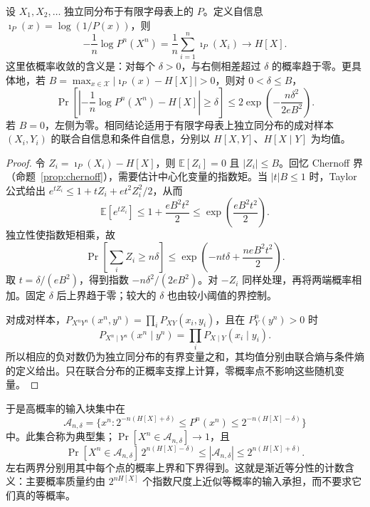\documentclass[lang=cn,a4paper,fontset=none,zihao=false,10pt,openany,twoside]{beautybook}
\numberwithin{algorithm}{chapter}
\begin{document}
\begin{proposition}[自信息的集中与渐近等分性]\label{prop:aep}
设 $X_1,X_2,\ldots$ 独立同分布于有限字母表上的 $P$。定义自信息 $\imath_P(x)=\log(1/P(x))$，则
\[
 -\frac1n\log P^n(X^n)=\frac1n\sum_{i=1}^n\imath_P(X_i)
 \to H[X].
\]
这里依概率收敛的含义是：对每个 $\delta>0$，与右侧相差超过 $\delta$ 的概率趋于零。更具体地，若 $B=\max_{x\in\mathcal X}|\imath_P(x)-H[X]|>0$，则对 $0<\delta\le B$，
\[
 \Pr\left[\left|-\frac1n\log P^n(X^n)-H[X]\right|\ge\delta\right]
 \le2\exp\left(-\frac{n\delta^2}{2eB^2}\right).
\]
若 $B=0$，左侧为零。相同结论适用于有限字母表上独立同分布的成对样本 $(X_i,Y_i)$ 的联合自信息和条件自信息，分别以 $H[X,Y]$、$H[X\mid Y]$ 为均值。
\end{proposition}
\begin{proof}
令 $Z_i=\imath_P(X_i)-H[X]$，则 $\mathbb E[Z_i]=0$ 且 $|Z_i|\le B$。回忆 Chernoff 界（命题~\ref{prop:chernoff}），需要估计中心化变量的指数矩。当 $|t|B\le1$ 时，Taylor 公式给出 $e^{tZ_i}\le1+tZ_i+e t^2Z_i^2/2$，从而
\[
 \mathbb E[e^{tZ_i}]\le1+\frac{eB^2t^2}{2}
 \le\exp\left(\frac{eB^2t^2}{2}\right).
\]
独立性使指数矩相乘，故
\[
 \Pr\left[\sum_iZ_i\ge n\delta\right]
 \le\exp\left(-nt\delta+\frac{neB^2t^2}{2}\right).
\]
取 $t=\delta/(eB^2)$，得到指数 $-n\delta^2/(2eB^2)$。对 $-Z_i$ 同样处理，再将两端概率相加。固定 $\delta$ 后上界趋于零；较大的 $\delta$ 也由较小阈值的界控制。

对成对样本，$P_{X^nY^n}(x^n,y^n)=\prod_iP_{XY}(x_i,y_i)$，且在 $P_Y^n(y^n)>0$ 时
\[
 P_{X^n\mid Y^n}(x^n\mid y^n)=\prod_iP_{X\mid Y}(x_i\mid y_i).
\]
所以相应的负对数仍为独立同分布的有界变量之和，其均值分别由联合熵与条件熵的定义给出。只在联合分布的正概率支撑上计算，零概率点不影响这些随机变量。
\end{proof}
于是高概率的输入块集中在
\[
 \mathcal A_{n,\delta}
 =\{x^n:2^{-n(H[X]+\delta)}\le P^n(x^n)\le2^{-n(H[X]-\delta)}\}
\]
中。此集合称为典型集；$\Pr[X^n\in\mathcal A_{n,\delta}]\to1$，且
\[
 \Pr[X^n\in\mathcal A_{n,\delta}]\,2^{n(H[X]-\delta)}
 \le|\mathcal A_{n,\delta}|\le2^{n(H[X]+\delta)}.
\]
左右两界分别用其中每个点的概率上界和下界得到。这就是渐近等分性的计数含义：主要概率质量约由 $2^{nH[X]}$ 个指数尺度上近似等概率的输入承担，而不要求它们真的等概率。
\end{document}
